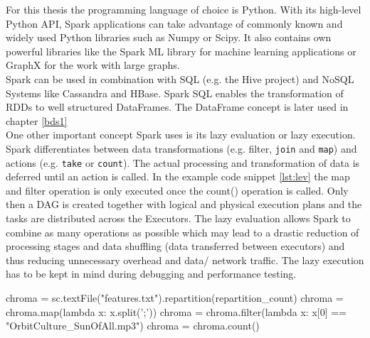 For this thesis the programming language of choice is Python. With its high-level  Python API, Spark applications can take advantage of commonly known and widely used Python libraries such as Numpy or Scipy. It also contains own powerful libraries like the Spark ML library for machine learning applications or GraphX for the work with large graphs.\\ 
Spark can be used in combination with SQL (e.g. the Hive project) and NoSQL Systems like Cassandra and HBase. Spark SQL enables the transformation of RDDs to well structured DataFrames. The DataFrame concept is later used in chapter \ref{bds1}\\
One other important concept Spark uses is its lazy evaluation or lazy execution. Spark differentiates between data transformations (e.g. filter, \lstinline{join} and \lstinline{map}) and actions (e.g. \lstinline{take} or \lstinline{count}). The actual processing and transformation of data is deferred until an action is called. In the example code snippet \ref{lst:lev} the map and filter operation is only executed once the count() operation is called. Only then a DAG is created together with logical and physical execution plans and the tasks are distributed across the Executors. The lazy evaluation allows Spark to combine as many operations as possible which may lead to a drastic reduction of processing stages and data shuffling (data transferred between executors) and thus reducing unnecessary overhead and data/ network traffic. The lazy execution has to be kept in mind during debugging and performance testing. \cite[p.73]{sparkbook1}

\begin{pythonCode}[frame=single,label={lst:lev},caption={lazy evaluation},captionpos=b]
chroma = sc.textFile("features.txt").repartition(repartition_count)
chroma = chroma.map(lambda x: x.split(';'))
chroma = chroma.filter(lambda x: x[0] == "OrbitCulture_SunOfAll.mp3")
chroma = chroma.count()
\end{pythonCode}

